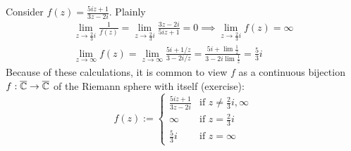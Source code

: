 \begin{example}{}{}
	Consider $f(z)=\frac{5iz+1}{3z-2i}$. Plainly 
  \begin{gather*}
  	\lim_{z\to\frac 23i}\frac 1{f(z)}=\lim_{z\to\frac 23i}\frac{3z-2i}{5iz+1}=0\implies \lim_{z\to\frac 23i}f(z)=\infty\\
  	\lim_{z\to\infty}f(z)= \lim_{z\to\infty}\frac{5i+1/z}{3-2i/z} = \frac{5i+\lim\frac 1z}{3-2i\lim\frac 1z}=\frac 53i
  \end{gather*}\goodbreak
Because of these calculations, it is common to view $f$ as a continuous bijection $f:\overline{\mathbb{C}}\to\overline{\mathbb{C}}$ of the Riemann sphere with itself (exercise):
\[
	f(z):=
	\begin{cases}
		\frac{5iz+1}{3z-2i}&\text{if }z\neq \frac 23i,\infty\\
		\infty&\text{if }z=\frac 23i\\
		\frac 53i&\text{if }z=\infty
	\end{cases}
\]
\end{example}

